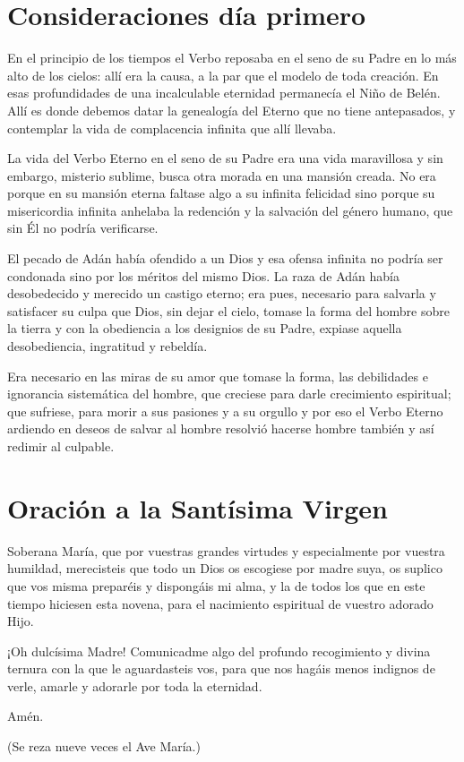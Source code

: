 \documentclass[spanish,utf8,12pt]{chlart}
\newenvironment{lectura}{\begingroup\color{lector}}{\endgroup\par}
\newenvironment{finalnotes}{\begingroup
	\footnotesize\sffamily\color{Gray}%
	\setlength{\leftskip}{3em}\setlength{\rightskip}{3em}\noindent
	}{\par\endgroup}
\begin{document}
\section{Consideraciones día primero}
\begin{lectura}
En el principio de los tiempos el Verbo reposaba en el seno de su Padre
en lo más alto de los cielos:
allí era la causa, a la par que el modelo de toda creación.
En esas profundidades de una incalculable eternidad permanecía el Niño
de Belén.
Allí es donde debemos datar la genealogía del Eterno que no tiene
antepasados, y contemplar la vida de complacencia infinita que allí
llevaba.

La vida del Verbo Eterno en el seno de su Padre era una vida maravillosa
y sin embargo, misterio sublime, busca otra morada en una mansión
creada.
No era porque en su mansión eterna faltase algo a su infinita felicidad
sino porque su misericordia infinita anhelaba la redención y la
salvación del género humano, que sin Él no podría verificarse.

El pecado de Adán había ofendido a un Dios y esa ofensa infinita no
podría ser condonada sino por los méritos del mismo Dios.
La raza de Adán había desobedecido y merecido un castigo eterno; era
pues, necesario para salvarla y satisfacer su culpa que Dios, sin dejar
el cielo, tomase la forma del hombre sobre la tierra y con la obediencia
a los designios de su Padre, expiase aquella desobediencia, ingratitud y
rebeldía.

Era necesario en las miras de su amor que tomase la forma, las
debilidades e ignorancia sistemática del hombre, que creciese para darle
crecimiento espiritual; que sufriese, para morir a sus pasiones y a su
orgullo y por eso el Verbo Eterno ardiendo en deseos de salvar al hombre
resolvió hacerse hombre también y así redimir al culpable.
\end{lectura}

\section{Oración a la Santísima Virgen}
\begin{lectura}
Soberana María, que por vuestras grandes virtudes y especialmente por
vuestra humildad, merecisteis que todo un Dios os escogiese por madre
suya, os suplico que vos misma preparéis y dispongáis mi alma, y la de
todos los que en este tiempo hiciesen esta novena, para el nacimiento
espiritual de vuestro adorado Hijo.

¡Oh dulcísima Madre!
Comunicadme algo del profundo recogimiento y divina ternura con la que
le aguardasteis vos, para que nos hagáis menos indignos de verle, amarle
y adorarle por toda la eternidad.

Amén.
\end{lectura}
\begin{finalnotes}
(Se reza nueve veces el Ave María.)
\end{finalnotes}
\end{document}
